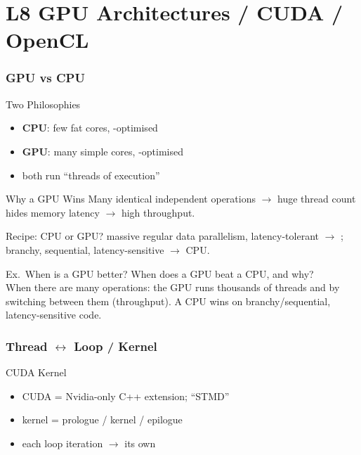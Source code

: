 \section{L8 GPU Architectures / CUDA / OpenCL}

\subsubsection{GPU vs CPU}


\begin{definition}{Two Philosophies}
    \begin{itemize}
        \item \textbf{CPU}: few fat cores, -optimised
        \item \textbf{GPU}: many simple cores, -optimised
        \item both run ``threads of execution''
    \end{itemize}
\end{definition}

\begin{concept}{Why a GPU Wins}
    Many identical independent operations $\to$ huge thread count hides memory latency $\to$ high throughput.
\end{concept}

\multend

\begin{KR}{Recipe: CPU or GPU?}
    massive regular data parallelism, latency-tolerant $\to$ ; branchy, sequential, latency-sensitive $\to$ CPU.
\end{KR}

\begin{example2}{Ex.\ When is a GPU better?}
    When does a GPU beat a CPU, and why?
     \\ 
    When there are many  operations: the GPU runs thousands of threads and  by switching between them (throughput). A CPU wins on branchy/sequential, latency-sensitive code.
\end{example2}

\subsubsection{Thread $\leftrightarrow$ Loop / Kernel}


\begin{definition}{CUDA Kernel}
    \begin{itemize}
        \item CUDA = Nvidia-only C++ extension; ``STMD''
        \item kernel = prologue / kernel / epilogue
        \item each loop iteration $\to$ its own 
    \end{itemize}
\end{definition}

